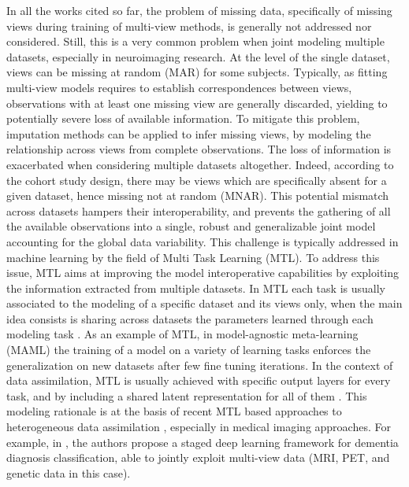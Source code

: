 	 In all the works cited so far, the problem of missing data, specifically of missing views during training of multi-view methods, is generally not addressed nor considered.
Still, this is a very common problem when joint modeling multiple datasets, especially in neuroimaging research.
At the level of the single dataset, views can be missing at random (MAR) for some subjects.
Typically, as fitting multi-view models requires to establish correspondences between views, observations with at least one missing view are generally discarded, yielding to potentially severe loss of available information.
To mitigate this problem, imputation methods can be applied to infer missing views, by modeling the relationship across views from complete observations.
%
The loss of information is exacerbated when considering multiple datasets altogether.
Indeed, according to the cohort study design, there may be views which are specifically absent for a given dataset, hence missing not at random (MNAR).
This potential mismatch across datasets hampers their interoperability,
and prevents the gathering of all the available observations into a single, robust and generalizable joint model accounting for the global data variability.
%
This challenge is typically addressed in machine learning by the field of Multi Task Learning (MTL).
To address this issue, MTL aims at improving the model interoperative capabilities by exploiting the information extracted from multiple datasets.
In MTL each task is usually associated to the modeling of a specific dataset and its views only,
when the main idea consists is sharing across datasets the parameters learned through each modeling task \citep{Caruana1998, Dorado-Moreno2020}.
As an example of MTL, in model-agnostic meta-learning (MAML) \citep{MAML1} the training of a model on a variety of learning tasks enforces the generalization on new datasets after few fine tuning iterations.
%
In the context of data assimilation, MTL is usually achieved with specific output layers for every task, and by including a shared latent representation for all of them \citep{Dorado-Moreno2020}.
This modeling rationale is at the basis of recent MTL based approaches to heterogeneous data assimilation \citep{Wu2018, Shi2019},
especially in medical imaging approaches.
%
	For example, in \cite{Zhou2019a}, the authors propose a staged deep learning framework for dementia diagnosis classification,
	able to jointly exploit multi-view data (MRI, PET, and genetic data in this case).
